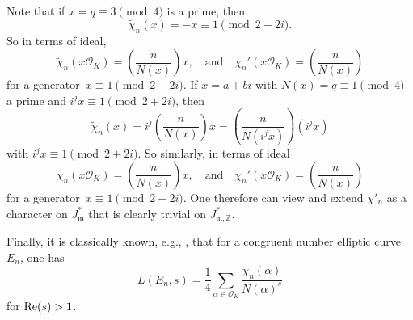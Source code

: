 \documentclass[11pt, reqno]{amsart}
\theoremstyle{plain}
\theoremstyle{definition}
\numberwithin{equation}{section}
\begin{document}
Note that if $x=q\equiv3\pmod{4}$ is a prime, then 
$$
\tilde{\chi}_{n}(x)=-x\equiv 1\pmod{2+2i}.
$$
So  in terms of ideal, 
$$
\tilde{\chi}_{n}(x\mathcal{O}_{K})=\left(\frac{n}{N(x)}\right)x,\quad\mbox{and}\quad \chi_{n}'(x\mathcal{O}_{K})=\left(\frac{n}{N(x)}\right)
$$
for a generator~$x\equiv1\pmod{2+2i}$.  
If $x=a+bi$ with $N(x)=q\equiv1\pmod{4}$ a prime and $i^{j}x\equiv1\pmod{2+2i}$, then
$$
\tilde{\chi}_{n}(x)=i^{j}\left(\frac{n}{N(x)}\right)x=\left(\frac{n}{N(i^{j}x)}\right)(i^{j}x)
$$
with $i^{j}x\equiv1\pmod{2+2i}$.
So similarly, in terms of ideal
$$
\tilde{\chi}_{n}(x\mathcal{O}_{K})=\left(\frac{n}{N(x)}\right)x,\quad\mbox{and}\quad \chi_{n}'(x\mathcal{O}_{K})=\left(\frac{n}{N(x)}\right)
$$
for a generator~$x\equiv1\pmod{2+2i}$. One therefore can view and extend ${\chi}'_{n}$ as  a character on $J_{\mathfrak{m}}^{*}$ that is clearly trivial on $J_{\mathfrak{m},\mathbb{Z}}^{*}$. 

Finally, it is classically known, e.g., \cite{K}, that for a congruent number elliptic
 curve~$E_{n}$, one has
$$
L(E_{n},s)=\frac{1}{4}\sum_{\alpha\in \mathcal{O}_{K}}\frac{\tilde{\chi}_{n}(\alpha)}{N(\alpha)^{s}}
$$
for ${\rm Re}(s)>1$.


\end{document}
